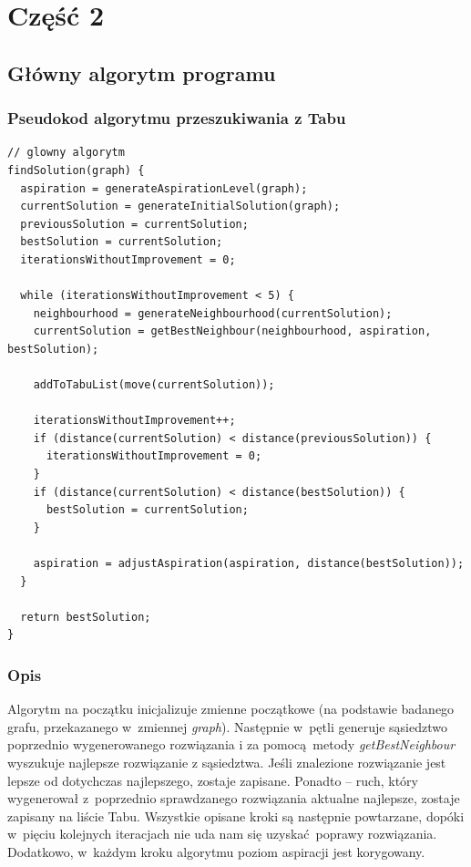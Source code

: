 \documentclass[11pt,a4paper]{article}
\begin{document}
\newpage
\section{Część 2}
\subsection{Główny algorytm programu}
\subsubsection{Pseudokod algorytmu przeszukiwania z Tabu}
\begin{lstlisting}[caption = Pseudokod algorytmu przeszukiwania z Tabu]
// glowny algorytm
findSolution(graph) {
  aspiration = generateAspirationLevel(graph);
  currentSolution = generateInitialSolution(graph);
  previousSolution = currentSolution;
  bestSolution = currentSolution;
  iterationsWithoutImprovement = 0;

  while (iterationsWithoutImprovement < 5) {
    neighbourhood = generateNeighbourhood(currentSolution);
    currentSolution = getBestNeighbour(neighbourhood, aspiration, bestSolution);

    addToTabuList(move(currentSolution));

    iterationsWithoutImprovement++;
    if (distance(currentSolution) < distance(previousSolution)) {
      iterationsWithoutImprovement = 0;
    }
    if (distance(currentSolution) < distance(bestSolution)) {
      bestSolution = currentSolution;
    }

    aspiration = adjustAspiration(aspiration, distance(bestSolution));
  }

  return bestSolution;
}
\end{lstlisting}

\subsubsection{Opis}
Algorytm na początku inicjalizuje zmienne początkowe (na podstawie badanego grafu, przekazanego w~zmiennej \textit{graph}). Następnie w~pętli generuje sąsiedztwo poprzednio wygenerowanego rozwiązania i za pomocą metody \textit{getBestNeighbour} wyszukuje najlepsze rozwiązanie z sąsiedztwa. Jeśli znalezione rozwiązanie jest lepsze od dotychczas najlepszego, zostaje zapisane. Ponadto -- ruch, który wygenerował z~poprzednio sprawdzanego rozwiązania aktualne najlepsze, zostaje zapisany na liście Tabu. Wszystkie opisane kroki są następnie powtarzane, dopóki w~pięciu kolejnych iteracjach nie uda nam się uzyskać poprawy rozwiązania. Dodatkowo, w~każdym kroku algorytmu poziom aspiracji jest korygowany.
\end{document}
